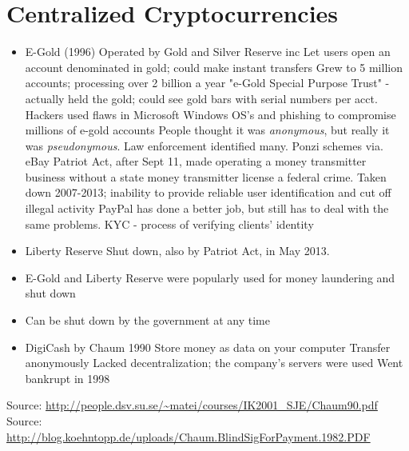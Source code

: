 \documentclass{article}
\begin{document}
\section*{Centralized Cryptocurrencies}
\begin{itemize}
  \item E-Gold (1996)
    \subitem Operated by Gold and Silver Reserve inc 
    \subitem Let users open an account denominated in gold; could make instant transfers
    \subitem Grew to 5 million accounts; processing over 2 billion a year
    \subitem "e-Gold Special Purpose Trust" - actually held the gold; could see gold bars with serial numbers per acct.
    \subitem Hackers used flaws in Microsoft Windows OS's and phishing to compromise millions of e-gold accounts
    \subitem People thought it was \emph{anonymous}, but really it was \emph{pseudonymous}. Law enforcement identified many.
    \subitem Ponzi schemes via. eBay 
    \subitem Patriot Act, after Sept 11, made operating a money transmitter business without a state money transmitter license a federal crime.
    \subitem Taken down 2007-2013; inability to provide reliable user identification and cut off illegal activity
    \subitem PayPal has done a better job, but still has to deal with the same problems.
    \subitem KYC - process of verifying clients' identity
  \item Liberty Reserve
    \subitem Shut down, also by Patriot Act, in May 2013. 
  \item E-Gold and Liberty Reserve were popularly used for money laundering and shut down
  \item Can be shut down by the government at any time
  \item DigiCash by Chaum 1990
    \subitem Store money as data on your computer
    \subitem Transfer anonymously
    \subitem Lacked decentralization; the company's servers were used
    \subitem Went bankrupt in 1998
\end{itemize}
Source: \url{http://people.dsv.su.se/~matei/courses/IK2001_SJE/Chaum90.pdf}\\
Source: \url{http://blog.koehntopp.de/uploads/Chaum.BlindSigForPayment.1982.PDF}
\end{document}
